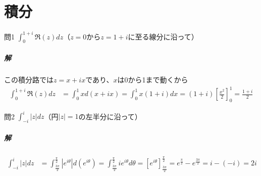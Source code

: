 \chapter{積分}%

\begin{mysimplebox}{問1}
   $\int_{0}^{1+i}\Re(z)dz$（$z=0$から$z=1+i$に至る線分に沿って）
\end{mysimplebox}
\paragraph{解}
この積分路では$z=x+ix$であり、$x$は0から1まで動くから
\begin{align*}
    \int_{0}^{1+i}\Re(z)dz
    &=\int_{0}^{1}xd(x+ix)
    =\int_{0}^{1}x(1+i)dx
    =(1+i)\left[\frac{x^2}{2}\right]_0^1
    =\frac{1+i}{2}
\end{align*}

\begin{mysimplebox}{問2}
    $\int_{-i}^{i}|z|dz$（円$|z|=1$の左半分に沿って）
 \end{mysimplebox}
 \paragraph{解}
 \begin{align*}
    \int_{-i}^{i}|z|dz
    &=\int_{\frac{3\pi}{2}}^{\frac{\pi}{2}}|e^{i\theta}|d(e^{i\theta})
    =\int_{\frac{3\pi}{2}}^{\frac{\pi}{2}}ie^{i\theta}d\theta
    =\left[e^{i\theta}\right]_{\frac{3\pi}{2}}^{\frac{\pi}{2}}
    =e^{\frac{\pi}{2}}-e^{\frac{3\pi}{2}}=i-(-i)=2i
 \end{align*}